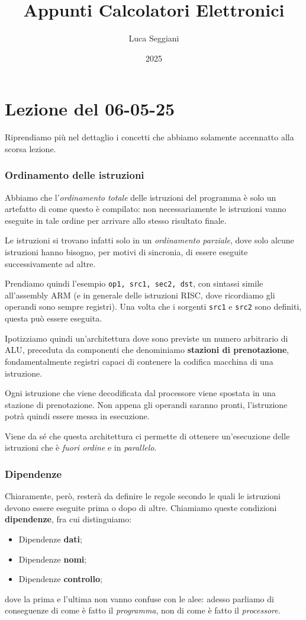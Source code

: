 \documentclass[a4paper,11pt]{article}
\title{Appunti Calcolatori Elettronici}
\author{Luca Seggiani}
\date{2025}
\begin{document}
\section{Lezione del 06-05-25}

\thispagestyle{empty}
\pagestyle{fancy}

Riprendiamo più nel dettaglio i concetti che abbiamo solamente accennatto alla scorsa lezione.

\subsubsection{Ordinamento delle istruzioni}
Abbiamo che l'\textit{ordinamento totale} delle istruzioni del programma è solo un artefatto di come questo è compilato: non necessariamente le istruzioni vanno eseguite in tale ordine per arrivare allo stesso risultato finale.

Le istruzioni si trovano infatti solo in un \textit{ordinamento parziale}, dove solo alcune istruzioni hanno bisogno, per motivi di sincronia, di essere eseguite successivamente ad altre.

Prendiamo quindi l'esempio \lstinline|op1, src1, sec2, dst|, con sintassi simile all'assembly ARM (e in generale delle istruzioni RISC, dove ricordiamo gli operandi sono sempre registri). 
Una volta che i sorgenti \lstinline|src1| e \lstinline|src2| sono definiti, questa può essere eseguita.

Ipotizziamo quindi un'architettura dove sono previste un numero arbitrario di ALU, preceduta da componenti che denominiamo \textbf{stazioni di prenotazione}, fondamentalmente registri capaci di contenere la codifica macchina di una istruzione.

Ogni istruzione che viene decodificata dal processore viene spostata in una stazione di prenotazione. 
Non appena gli operandi saranno pronti, l'istruzione potrà quindi essere messa in esecuzione.

Viene da sé che questa architettura ci permette di ottenere un'esecuzione delle istruzioni che è \textit{fuori ordine} e in \textit{parallelo}.

\subsubsection{Dipendenze}
Chiaramente, però, resterà da definire le regole secondo le quali le istruzioni devono essere eseguite prima o dopo di altre.
Chiamiamo queste condizioni \textbf{dipendenze}, fra cui distinguiamo:
\begin{itemize}
	\item Dipendenze \textbf{dati};
	\item Dipendenze \textbf{nomi};
	\item Dipendenze \textbf{controllo};
\end{itemize}
dove la prima e l'ultima non vanno confuse con le alee: adesso parliamo di conseguenze di come è fatto il \textit{programma}, non di come è fatto il \textit{processore}.
\end{document}
